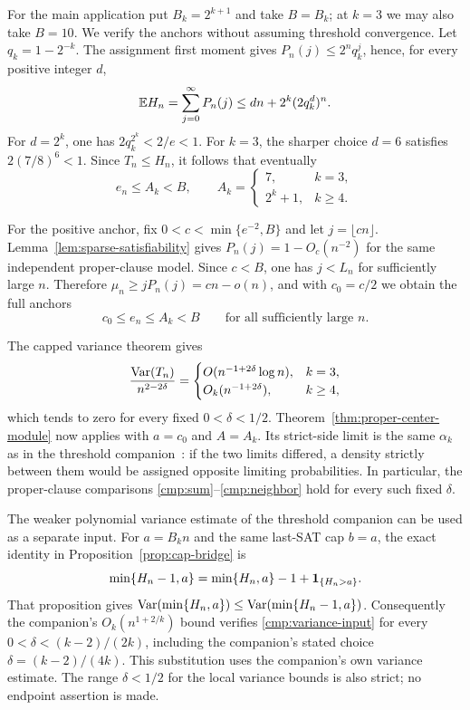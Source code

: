 For the main application put $B_k=2^{k+1}$ and take $B=B_k$; at $k=3$
we may also take $B=10$.  We verify the anchors without assuming threshold
convergence.  Let $q_k=1-2^{-k}$.  The assignment first moment gives
$P_n(j)\le2^nq_k^j$, hence, for every positive integer $d$,
\begin{equation}\label{cmp:mean-upper}
 \mathbb E H_n=\sum_{j=0}^{\infty}P_n(j)
       \le dn+2^k(2q_k^d)^n.
\end{equation}
For $d=2^k$, one has $2q_k^{2^k}<2/e<1$.  For $k=3$, the sharper choice
$d=6$ satisfies $2(7/8)^6<1$.  Since $T_n\le H_n$, it follows that
eventually
\begin{equation}\label{cmp:center-upper}
 e_n\le A_k<B,
 \qquad A_k=\begin{cases}7,&k=3,\\2^k+1,&k\ge4.\end{cases}
\end{equation}

For the positive anchor, fix $0<c<\min\{e^{-2},B\}$ and let
$j=\lfloor cn\rfloor$.  Lemma~\ref{lem:sparse-satisfiability} gives
$P_n(j)=1-O_c(n^{-2})$ for the same independent proper-clause model.
Since $c<B$, one has $j<L_n$ for sufficiently large $n$.  Therefore
$\mu_n\ge jP_n(j)=cn-o(n)$, and with $c_0=c/2$ we obtain the full anchors
\begin{equation}\label{cmp:center-bounds}
 c_0\le e_n\le A_k<B
 \qquad\text{for all sufficiently large }n.
\end{equation}

The capped variance theorem gives
\[
 \frac{\operatorname{Var}(T_n)}{n^{2-2\delta}}
 =\begin{cases}
 O(n^{-1+2\delta}\log n),&k=3,\\
 O_k(n^{-1+2\delta}),&k\ge4,
 \end{cases}
\]
which tends to zero for every fixed $0<\delta<1/2$.
Theorem~\ref{thm:proper-center-module} now applies with $a=c_0$ and
$A=A_k$.  Its strict-side limit is the same $\alpha_k$ as in the threshold
companion~\cite[Theorem~\ThresholdTheorem]{FixedKThreshold}: if the two
limits differed, a density strictly between them would be assigned opposite
limiting probabilities.  In particular, the proper-clause comparisons
\eqref{cmp:sum}--\eqref{cmp:neighbor} hold for every such fixed $\delta$.

The weaker polynomial variance estimate of the threshold companion
\cite[Proposition~\ThresholdVariance]{FixedKThreshold} can be used as a
separate input.  For $a=B_kn$ and the same last-SAT cap $b=a$, the exact
identity in Proposition~\ref{prop:cap-bridge} is
\[
 \min\{H_n-1,a\}=\min\{H_n,a\}-1+\mathbf 1_{\{H_n>a\}}.
\]
That proposition gives
$\operatorname{Var}(\min\{H_n,a\})\le\operatorname{Var}(\min\{H_n-1,a\})$.
Consequently the companion's $O_k(n^{1+2/k})$ bound verifies
\eqref{cmp:variance-input} for every
$0<\delta<(k-2)/(2k)$, including the companion's stated choice
$\delta=(k-2)/(4k)$.  This substitution uses the companion's own
variance estimate.  The range $\delta<1/2$ for the local variance bounds
is also strict; no endpoint assertion is made.
